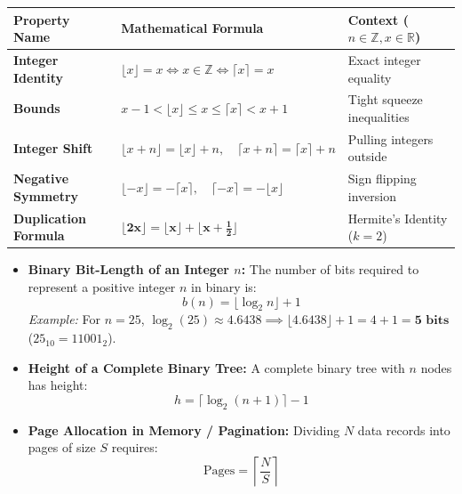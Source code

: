 \documentclass[11pt,a4paper]{article}
\begin{document}
\begin{notebox}
\renewcommand{\arraystretch}{1.2}
\begin{tabularx}{\linewidth}{@{}l X l@{}}
\toprule
\textbf{\color{navy}Property Name} & \textbf{\color{navy}Mathematical Formula} & \textbf{\color{navy}Context ($n \in \mathbb{Z}, x \in \mathbb{R}$)} \\
\midrule
\textbf{Integer Identity} & $\lfloor x \rfloor = x \iff x \in \mathbb{Z} \iff \lceil x \rceil = x$ & Exact integer equality \\
\textbf{Bounds} & $x - 1 < \lfloor x \rfloor \le x \le \lceil x \rceil < x + 1$ & Tight squeeze inequalities \\
\textbf{Integer Shift} & $\lfloor x + n \rfloor = \lfloor x \rfloor + n, \quad \lceil x + n \rceil = \lceil x \rceil + n$ & Pulling integers outside \\
\textbf{Negative Symmetry} & $\lfloor -x \rfloor = -\lceil x \rceil, \quad \lceil -x \rceil = -\lfloor x \rfloor$ & Sign flipping inversion \\
\textbf{Duplication Formula} & $\mathbf{\lfloor 2x \rfloor = \lfloor x \rfloor + \lfloor x + \frac{1}{2} \rfloor}$ & Hermite's Identity ($k=2$) \\
\bottomrule
\end{tabularx}
\end{notebox}

\begin{examplebox}
\begin{itemize}
    \item \textbf{Binary Bit-Length of an Integer $n$:} The number of bits required to represent a positive integer $n$ in binary is:
    \[
    b(n) = \lfloor \log_2 n \rfloor + 1
    \]
    \textit{Example:} For $n = 25$, $\log_2(25) \approx 4.6438 \implies \lfloor 4.6438 \rfloor + 1 = 4 + 1 = \mathbf{5 \text{ bits}}$ ($25_{10} = 11001_2$).
    \item \textbf{Height of a Complete Binary Tree:} A complete binary tree with $n$ nodes has height:
    \[
    h = \lceil \log_2(n + 1) \rceil - 1
    \]
    \item \textbf{Page Allocation in Memory / Pagination:} Dividing $N$ data records into pages of size $S$ requires:
    \[
    \text{Pages} = \left\lceil \frac{N}{S} \right\rceil
    \]
\end{itemize}
\end{examplebox}
\end{document}
